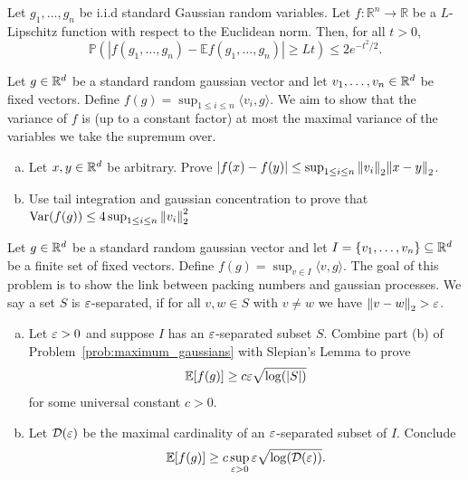 \begin{theorem}
    Let $g_1, \ldots, g_n$ be i.i.d standard Gaussian random variables. Let $f:\mathbb{R}^n\rightarrow \mathbb{R}$ be a $L$-Lipschitz function with respect to the Euclidean norm. Then, for all $t>0$,
    \begin{equation}\label{conc_gauss}
    \mathbb{P}(|f(g_1,\ldots,g_n)-\mathbb{E}f(g_1,\ldots,g_n)|\ge L t)\le 2e^{-t^2/2}.
    \end{equation}
\end{theorem}





\begin{myexercise}
    \label{prob:gaussprocessvariance}
    Let $g \in \mathbb{R}^d$ be a standard random gaussian vector and let $v_1, \ldots, v_n \in \mathbb{R}^d$ be fixed vectors. Define $f(g) = \sup_{1 \leq i\leq n} \langle v_i,g \rangle$. We aim to show that the variance of $f$ is (up to a constant factor) at most the maximal variance of the variables we take the supremum over.
    \begin{enumerate}[(a)]
    \item Let $x,y \in \mathbb{R}^d$ be arbitrary. Prove $|f(x)-f(y)|\leq \sup_{1\leq i \leq n} {\left\lVert{v_i}\right\rVert}_2 {\left\lVert{x-y}\right\rVert}_2$.
    \item Use tail integration and gaussian concentration to prove that $\operatorname{Var}(f(g)) \leq 4 \sup_{1\leq i \leq n} {\left\lVert{v_i}\right\rVert}_2^2$
\end{enumerate}
    
\end{myexercise}



\begin{myexercise}
    \label{prob:sudakovinequality}
    Let $g \in \mathbb{R}^d$ be a standard random gaussian vector and let $ I=  \{v_1, \ldots, v_n\} \subseteq \mathbb{R}^d$ be a finite set of fixed vectors. Define $f(g) = \sup_{v \in I } \langle v,g \rangle$. The goal of this problem is to show the link between packing numbers and gaussian processes. We say a set $S$ is $\varepsilon$-separated, if for all $v,w \in S$ with $v \neq w$ we have ${\left\lVert{v-w}\right\rVert}_2 > \varepsilon$.
    \begin{enumerate}[(a)]
    \item Let $ \varepsilon >0$ and suppose $I$ has an $\varepsilon$-separated subset $S$. Combine part (b) of Problem~\ref{prob:maximum_gaussians} with Slepian's Lemma to prove
    $$ \mathbb{E}[f(g)] \geq c \varepsilon \sqrt{\log(|S|)}$$
    for some universal constant $c>0$.
    \item Let $\mathcal{D}(\varepsilon)$ be the maximal cardinality of an $\varepsilon$-separated subset of $I$. Conclude
    $$ \mathbb{E}[f(g)] \geq c \sup_{\varepsilon >0} \varepsilon \sqrt{\log(\mathcal{D}(\varepsilon))}.$$
\end{enumerate}
    
\end{myexercise}


